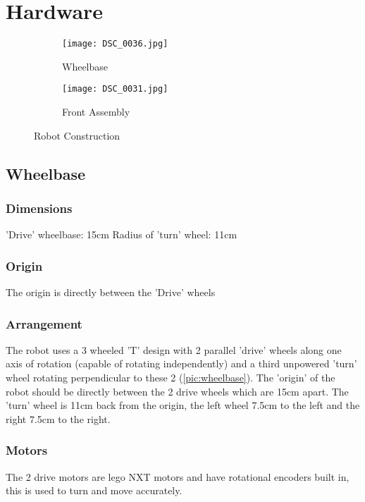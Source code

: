 \section{Hardware}

\begin{figure}[H]
\begin{subfigure}{.5\textwidth}
\centering
\texttt{[image: DSC\_0036.jpg]}
\caption{Wheelbase}
\label{pic:wheelbase}
\end{subfigure}
\begin{subfigure}{.5\textwidth}
\centering
\texttt{[image: DSC\_0031.jpg]}
\caption{Front Assembly}
\label{pic:front}
\end{subfigure}
\caption{Robot Construction}
\label{pic:construction}
\end{figure}

\subsection{Wheelbase}
\subsubsection{Dimensions}
'Drive' wheelbase:		15cm \newline
Radius of 'turn' wheel: 11cm
\subsubsection{Origin}
The origin is directly between the 'Drive' wheels
\subsubsection{Arrangement}
The robot uses a 3 wheeled 'T' design with 2 parallel 'drive' wheels along one axis of rotation (capable of rotating independently) and a third unpowered 'turn' wheel rotating perpendicular to these 2 (\autoref{pic:wheelbase}). The 'origin' of the robot should be 
directly between the 2 drive wheels which are 15cm apart. The 'turn' wheel 
is 11cm back from the origin, the left wheel 7.5cm to the left and the right
7.5cm to the right. 

\subsubsection{Motors}
The 2 drive motors are lego NXT motors and have rotational encoders built in, this is used to turn and move accurately. 




